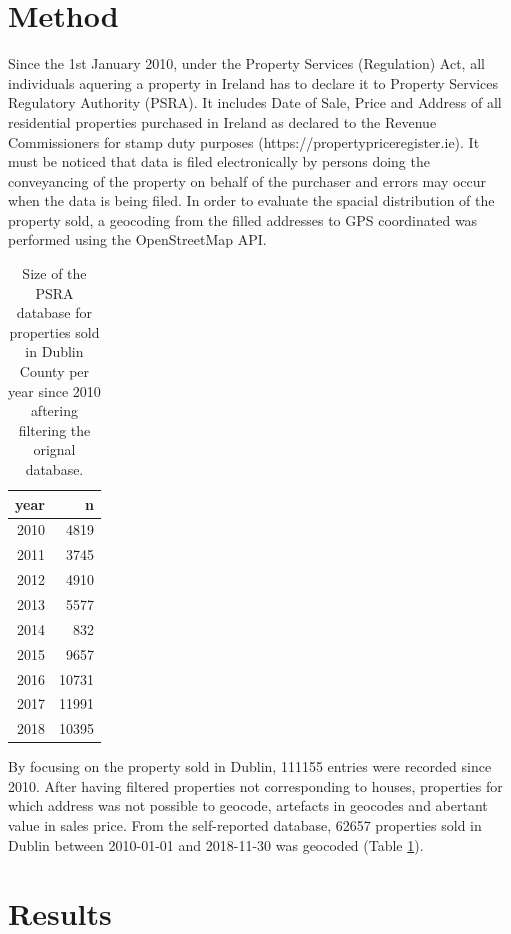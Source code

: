 \documentclass[]{elsarticle} %
\begin{document}
\section{Method}\label{method}

Since the 1st January 2010, under the Property Services (Regulation)
Act, all individuals aquering a property in Ireland has to declare it to
Property Services Regulatory Authority (PSRA). It includes Date of Sale,
Price and Address of all residential properties purchased in Ireland as
declared to the Revenue Commissioners for stamp duty purposes
(https://propertypriceregister.ie). It must be noticed that data is
filed electronically by persons doing the conveyancing of the property
on behalf of the purchaser and errors may occur when the data is being
filed. In order to evaluate the spacial distribution of the property
sold, a geocoding from the filled addresses to GPS coordinated was
performed using the OpenStreetMap API.

\begin{table}[!h]

\caption{\label{tab:dublin-sample-size}Size of the PSRA database for properties sold in Dublin County per year since 2010 aftering filtering the orignal database.}
\centering
\fontsize{8}{10}\selectfont
\begin{tabular}{rr}
\toprule
year & n\\
\midrule
2010 & 4819\\
2011 & 3745\\
2012 & 4910\\
2013 & 5577\\
2014 & 832\\
2015 & 9657\\
2016 & 10731\\
2017 & 11991\\
2018 & 10395\\
\bottomrule
\end{tabular}
\end{table}

By focusing on the property sold in Dublin, 111155 entries were recorded
since 2010. After having filtered properties not corresponding to
houses, properties for which address was not possible to geocode,
artefacts in geocodes and abertant value in sales price. From the
self-reported database, 62657 properties sold in Dublin between
2010-01-01 and 2018-11-30 was geocoded (Table
\ref{tab:dublin-sample-size}).

\section{Results}\label{results}
\end{document}
